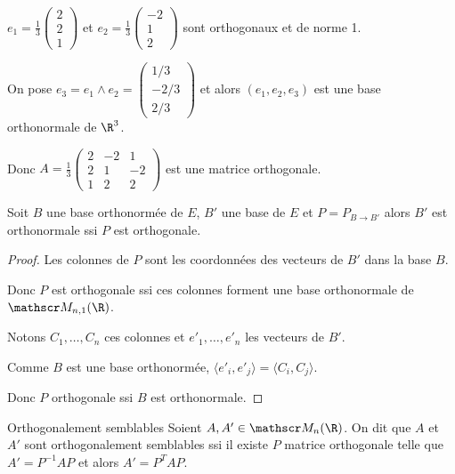 \begin{exemple}
    $e_1 = \frac 1 3 \begin{pmatrix}
        2 \\ 2  \\ 1
    \end{pmatrix}$ et $e_2 = \frac 1 3 \begin{pmatrix}
        -2 \\ 1 \\2 
    \end{pmatrix}$ sont orthogonaux et de norme 1.

    On pose $e_3 = e_1 \wedge e_2 = \begin{pmatrix}
        1/3 \\ -2/3 \\ 2/3
    \end{pmatrix}$ et alors $(e_1, e_2, e_3)$ est une base orthonormale de $\R^3$.

    Donc $A = \frac 1 3\begin{pmatrix}
        2 & -2 & 1 \\
        2 & 1 & -2 \\
        1 & 2 & 2
    \end{pmatrix}$ est une matrice orthogonale.
\end{exemple}

\begin{theoreme}{}{}
    Soit $B$ une base orthonormée de $E$, $B'$ une base de $E$
    et $P = P_{B \to B'}$ alors $B'$ est orthonormale ssi $P$ est orthogonale. 
\end{theoreme}

\begin{proof}
    Les colonnes de $P$ sont les coordonnées des vecteurs de $B'$ dans la base $B$. 

    Donc $P$ est orthogonale ssi ces colonnes forment une base orthonormale de $\mathscr M_{n, 1}(\R)$.
     
    Notons $C_1, \dots, C_n$ ces colonnes et $e'_1, \dots, e'_n$ les vecteurs de $B'$. 

    Comme $B$ est une base orthonormée, $\langle e'_i, e'_j \rangle = \langle C_i, C_j \rangle$.

    Donc $P$ orthogonale ssi $B$ est orthonormale. 
\end{proof}

\begin{definition}{Orthogonalement semblables}{}
    Soient $A, A' \in \mathscr M_n(\R)$. On dit que $A$ et $A'$ sont orthogonalement semblables ssi 
    il existe $P$ matrice orthogonale telle que $A' = P^{-1} A P$ et alors 
    $A' = P^T A P$.
\end{definition}

